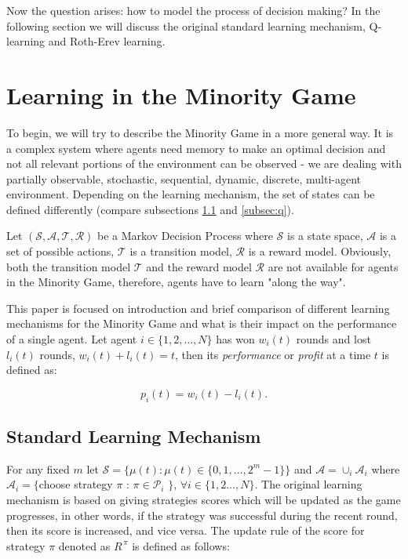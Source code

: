 \documentclass[12pt,american,czech]{article}
\begin{document}
\medskip

Now the question arises: how to model the process of decision making? In the following section we will discuss the original standard learning mechanism, Q-learning and Roth-Erev learning.

\section{Learning in the Minority Game}

To begin, we will try to describe the Minority Game in a more general way. It is a complex system where agents need memory to make an optimal decision and not all relevant portions of the environment can be observed - we are dealing with partially observable, stochastic, sequential, dynamic, discrete, multi-agent environment. Depending on the learning mechanism, the set of states can be defined differently (compare subsections \ref{subsec:original} and \ref{subsec:q}). 

\medskip

Let $(\mathcal{S},\mathcal{A},\mathcal{T},\mathcal{R})$ be a Markov Decision Process where $\mathcal{S}$ is a state space, $\mathcal{A}$ is a set of possible actions, $\mathcal{T}$ is a transition model, $\mathcal{R}$ is a reward model. Obviously, both the transition model $\mathcal{T}$ and the reward model $\mathcal{R}$ are not available for agents in the Minority Game, therefore, agents have to learn "along the way".

\medskip

This paper is focused on introduction and brief comparison of different learning mechanisms for the Minority Game and what is their impact on the performance of a single agent. Let agent $i\in\{1,2,\dots,N\}$ has won $w_{i}(t)$ rounds and lost $l_{i}(t)$ rounds, $w_{i}(t)+l_{i}(t)=t$, then its \textit{performance} or \textit{profit} at a time $t$ is defined as:

\begin{equation}
p_{i}(t) = w_{i}(t)-l_{i}(t).
\end{equation}

\subsection{Standard Learning Mechanism}\label{subsec:original}

For any fixed $m$ let $\mathcal{S}=\big\{\mu(t):\mu(t)\in\{0,1,\dots,2^{m}-1\}\big\}$ and $\mathcal{A}=\cup_{i}\mathcal{A}_i$ where $\mathcal{A}_i=\{$choose strategy $\pi$ : $\pi\in\mathcal{P}_{i}$ $\}$, $\forall i\in\{1,2\dots,N\}$. The original learning mechanism is based on giving strategies scores which will be updated as the game progresses, in other words, if the strategy was successful during the recent round, then its score is increased, and vice versa. The update rule of the score for strategy $\pi$ denoted as $R^{\,\pi}$ is defined as follows:
\end{document}
